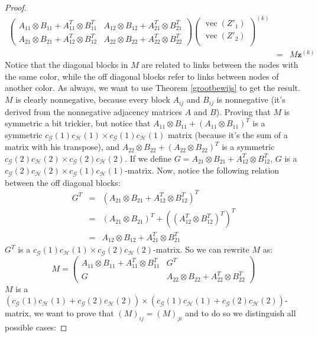 \documentclass[a4paper,11pt]{report}
\newcommand{\graf}{\mathscr{G}}
\newcommand{\grafeen}{\mathscr{H}}
\newcommand{\vect}{\operatorname{vec}}
\begin{document}
\begin{proof}
\begin{eqnarray*}
\begin{pmatrix}
A_{11}\otimes B_{11} + A^T_{11}\otimes B^T_{11}& A_{12}\otimes B_{12}+A^T_{21}\otimes B^T_{21}\\
A_{21}\otimes B_{21} + A^T_{12}\otimes B^T_{12} & A_{22}\otimes B_{22} + A^T_{22}\otimes B^T_{22}
\end{pmatrix}
\begin{pmatrix}
\vect(Z'_1)\\
\vect(Z'_2)\\
\end{pmatrix}^{(k)}\\
&=& M\mathbf{z}^{(k)}
\end{eqnarray*}
Notice that the diagonal blocks in $M$ are related to links between the nodes with the same color, 
while the off diagonal blocks refer to links between nodes of another color. As 
always, we want to use Theorem \ref{grootbewijs} to get the result. $M$ is 
clearly nonnegative, because every block $A_{ij}$ and $B_{ij}$ is nonnegative (it's derived from the nonnegative adjacency matrices $A$ and 
$B$). Proving that $M$ is symmetric a bit trickier, but notice that $A_{11}\otimes B_{11} + (A_{11}\otimes B_{11})^T$
is a symmetric $c_\graf(1)c_\grafeen(1)\times c_\graf(1)c_\grafeen(1)$ matrix (because it's the sum of a matrix with his transpose), and $A_{22}\otimes B_{22} + (A_{22}\otimes B_{22})^T$ is a symmetric 
$c_\graf(2)c_\grafeen(2)\times c_\graf(2)c_\grafeen(2)$. If we define $G = A_{21} \otimes B_{21} + A^T_{12}\otimes B^T_{12}$, $G$ is a $c_\graf(2)c_\grafeen(2) \times c_\graf(1)c_\grafeen(1)$-matrix. Now, notice the following relation between the off diagonal blocks:
\begin{eqnarray*}
  G^T &=& (A_{21} \otimes B_{21} + A^T_{12}\otimes B^T_{12})^T \\
  &=& (A_{21} \otimes B_{21})^T + ((A^T_{12}\otimes B^T_{12})^T)^T\\
  &=& A_{12}\otimes B_{12}+A^T_{21}\otimes B^T_{21}
  \end{eqnarray*}
$G^T$ is a $c_\graf(1)c_\grafeen(1) \times c_\graf(2)c_\grafeen(2)$-matrix.
So we can rewrite $M$ as:
$$M = \begin{pmatrix}
A_{11}\otimes B_{11} + A^T_{11}\otimes B^T_{11}& G^T\\
G & A_{22}\otimes B_{22} + A^T_{22}\otimes B^T_{22}
\end{pmatrix}$$
 $M$ is a $(c_\graf(1)c_\grafeen(1)+c_\graf(2)c_\grafeen(2))\times(c_\graf(1)c_\grafeen(1)+c_\graf(2)c_\grafeen(2))$-matrix, we want to prove that $(M)_{ij}  = (M)_{ji}$ and to do so we distinguish all possible cases: 
 

\end{proof}
\end{document}
